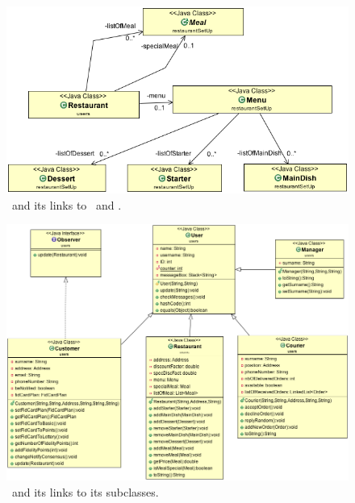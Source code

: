 \begin{figure}
  \begin{center}
    \includegraphics[scale=0.5]{./img/RestaurantToDishAndMeal.png}
    \end{center}
  \caption{\umld \Restaurant~and its links to \Dish~and \Meal.}
  \label{fig:restaurant_dish_meal_uml}
\end{figure}
\begin{figure}
  \begin{center}
    \includegraphics[scale=0.5]{./img/Users.png}
    \end{center}
  \caption{\umld \User~and its links to its subclasses.}
  \label{fig:users_uml}
\end{figure}


